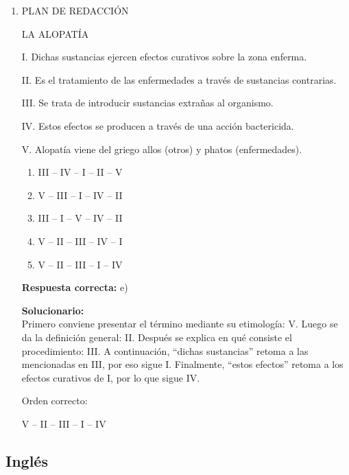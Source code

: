 \begin{enumerate}
	\vspace{6mm}
	
	
	
	\item PLAN DE REDACCIÓN
	
	LA ALOPATÍA
	
	I. Dichas sustancias ejercen efectos curativos sobre la zona enferma.
	
	II. Es el tratamiento de las enfermedades a través de sustancias contrarias.
	
	III. Se trata de introducir sustancias extrañas al organismo.
	
	IV. Estos efectos se producen a través de una acción bactericida.
	
	V. Alopatía viene del griego allos (otros) y phatos (enfermedades).
	
	\begin{enumerate}[label=\alph*)]
		\item III -- IV -- I -- II -- V
		\item V -- III -- I -- IV -- II
		\item III -- I -- V -- IV -- II
		\item V -- II -- III -- IV -- I
		\item V -- II -- III -- I -- IV
	\end{enumerate}
	\textbf{Respuesta correcta:} e)
	
	\vspace{2mm}
	\textbf{Solucionario:}\\
	Primero conviene presentar el término mediante su etimología: V.  
	Luego se da la definición general: II.  
	Después se explica en qué consiste el procedimiento: III.  
	A continuación, ``dichas sustancias'' retoma a las mencionadas en III, por eso sigue I.  
	Finalmente, ``estos efectos'' retoma a los efectos curativos de I, por lo que sigue IV.
	
	Orden correcto:
	
	V -- II -- III -- I -- IV
	
	\vspace{6mm}
	
\end{enumerate}

\subsection*{Inglés}

